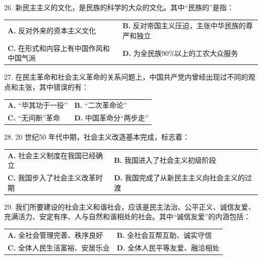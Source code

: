 \documentclass[UTF8,11pt]{ctexart}
\begin{document}
26. 新民主主义的文化，是民族的科学的大众的文化。其中“民族的”是指：


\begin{center}\begin{tabular}{>{\raggedright\arraybackslash}p{\dimexpr(\linewidth-4\tabcolsep)/2\relax}>{\raggedright\arraybackslash}p{\dimexpr(\linewidth-4\tabcolsep)/2\relax}}
\textbf{A.} 反对外来的资本主义文化 & \textbf{B.} 反对帝国主义压迫，主张中华民族的尊严和独立\\[.35em]
\textbf{C.} 在形式和内容上有中国作风和中国气派 & \textbf{D.} 为全民族90\%以上的工农大众服务\\[.35em]\end{tabular}\end{center}

27. 在民主革命和社会主义革命的关系问题上，中国共产党内曾经出现过不同的观点和主张，其中错误的有：


\begin{center}\begin{tabular}{>{\raggedright\arraybackslash}p{\dimexpr(\linewidth-4\tabcolsep)/2\relax}>{\raggedright\arraybackslash}p{\dimexpr(\linewidth-4\tabcolsep)/2\relax}}
\textbf{A.} “毕其功于一役” & \textbf{B.} “二次革命论”\\[.35em]
\textbf{C.} “无间断”革命 & \textbf{D.} 中国革命分“两步走”\\[.35em]\end{tabular}\end{center}

28. 20 世纪50 年代中期，社会主义改造基本完成，标志着：


\begin{center}\begin{tabular}{>{\raggedright\arraybackslash}p{\dimexpr(\linewidth-4\tabcolsep)/2\relax}>{\raggedright\arraybackslash}p{\dimexpr(\linewidth-4\tabcolsep)/2\relax}}
\textbf{A.} 社会主义制度在我国已经确立 & \textbf{B.} 我国进入了社会主义初级阶段\\[.35em]
\textbf{C.} 我国步入了社会主义改革时期 & \textbf{D.} 我国完成了从新民主主义向社会主义的过渡\\[.35em]\end{tabular}\end{center}

29. 我们所要建设的社会主义和谐社会，应该是民主法治、公平正义、诚信友爱、充满活力、安定有序、人与自然和谐相处的社会。其中“诚信友爱”的内涵包括：


\begin{center}\begin{tabular}{>{\raggedright\arraybackslash}p{\dimexpr(\linewidth-4\tabcolsep)/2\relax}>{\raggedright\arraybackslash}p{\dimexpr(\linewidth-4\tabcolsep)/2\relax}}
\textbf{A.} 全社会管理完善、秩序良好 & \textbf{B.} 全社会互帮互助、诚实守信\\[.35em]
\textbf{C.} 全体人民生活富裕、安居乐业 & \textbf{D.} 全体人民平等友爱、融洽相处\\[.35em]\end{tabular}\end{center}
\end{document}
